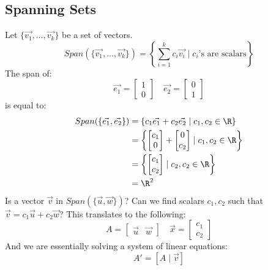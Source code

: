 \documentclass[letterpaper, 12pt]{math}
\begin{document}
\subsection*{Spanning Sets}
Let \( \{\vec{v_1},\dots,\vec{v_k}\} \) be a set of vectors.
\[ Span(\{\vec{v_1},\dots,\vec{v_k}\}) = \left\{\sum_{i=1}^{k}c_i\vec{v_i}\mid
  c_i \text{'s are scalars}\right\} \]
The span of:
\[ \vec{e_1} = \begin{bmatrix}1 \\ 0\end{bmatrix}\quad
  \vec{e_2} = \begin{bmatrix}0 \\ 1\end{bmatrix} \]
is equal to:
\begin{align*}
  Span(\{\vec{e_1},\vec{e_2}\}) &=
    \{c_1\vec{e_1}+c_2\vec{e_2}\mid c_1,c_2\in\R\} \\
  &= \left\{\begin{bmatrix}c_1 \\ 0\end{bmatrix}+
    \begin{bmatrix}0 \\ c_2\end{bmatrix}\mid c_1,c_2\in\R\right\} \\
  &= \left\{\begin{bmatrix}c_1 \\ c_2\end{bmatrix}\mid c_2,c_2\in\R\right\} \\
  &= \R^2
\end{align*}
Is a vector \( \vec{v} \) in \( Span(\{\vec{u},\vec{w}\}) \)? Can we find
scalars \( c_1,c_2 \) such that \( \vec{v} = c_1\vec{u}+c_2\vec{w} \)? This
translates to the following:
\[ A = \begin{bmatrix}\vec{u} & \vec{w}\end{bmatrix}\quad
  \vec{x} = \begin{bmatrix}c_1 \\ c_2\end{bmatrix} \]
And we are essentially solving a system of linear equations:
\[ A' = [A\mid\vec{v}] \]
\end{document}
